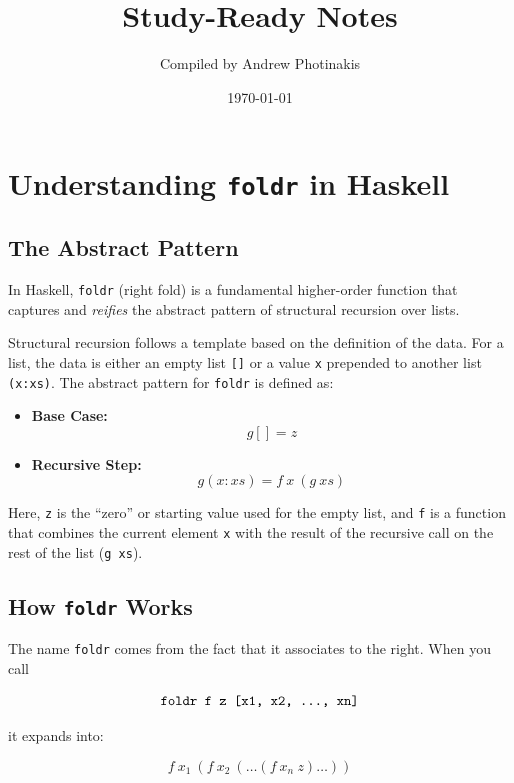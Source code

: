 \documentclass[12pt]{article}
\title{\TOPICTITLE\\\large Study-Ready Notes}
\author{Compiled by Andrew Photinakis}
\date{\today}
\begin{document}
\maketitle
\tableofcontents
\newpage

\section{Understanding \texttt{foldr} in Haskell}

\subsection{The Abstract Pattern}
In Haskell, \texttt{foldr} (right fold) is a fundamental higher-order function that captures and \emph{reifies} the abstract pattern of structural recursion over lists.

Structural recursion follows a template based on the definition of the data. For a list, the data is either an empty list \texttt{[]} or a value \texttt{x} prepended to another list \texttt{(x:xs)}. The abstract pattern for \texttt{foldr} is defined as:

\begin{itemize}
    \item \textbf{Base Case:}
          \[
              g [] = z
          \]
    \item \textbf{Recursive Step:}
          \[
              g (x:xs) = f\ x\ (g\ xs)
          \]
\end{itemize}

Here, \texttt{z} is the ``zero'' or starting value used for the empty list, and \texttt{f} is a function that combines the current element \texttt{x} with the result of the recursive call on the rest of the list (\texttt{g xs}).

\subsection{How \texttt{foldr} Works}
The name \texttt{foldr} comes from the fact that it associates to the right. When you call

\[
    \texttt{foldr f z [x1, x2, \dots, xn]}
\]

it expands into:

\[
    f\ x_1\ (f\ x_2\ (\dots (f\ x_n\ z) \dots ))
\]
\end{document}
